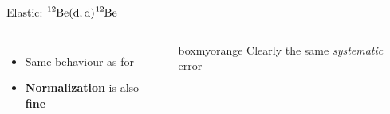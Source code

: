 \documentclass[sans,
frameno, %
mp,
usenames,dvipsnames, %
onlytextwidth, %
t,%
11pt]{beamer}
\newcommand{\iso}[2]{\ce{^{#1}#2}}
\begin{document}
\begin{frame}{Elastic: $\iso{12}{Be}(\textrm{d}, \textrm{d})\iso{12}{Be}$}
{\begin{figure}
\begin{minipage}[t]{0.48\linewidth}
            \end{minipage}
        \end{figure}
        \begin{columns}
            {
                \begin{itemize}
                    \item Same behaviour as for \iso{10}{Be}
                    \item \textbf{Normalization} is also \textbf{fine}
                \end{itemize}
            }\hfill
            {
                \begin{beamercolorbox}[sep=1ex, center, rounded=true]{boxmyorange}
                    Clearly the same \textit{systematic} error
                \end{beamercolorbox}

}
\end{columns}}
\end{frame}
\end{document}
